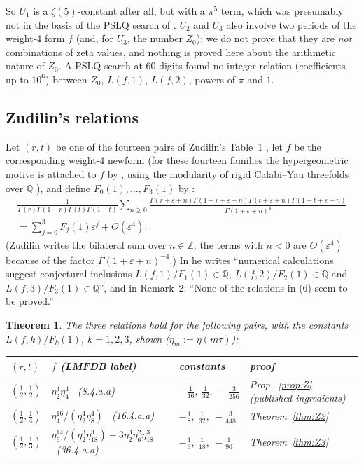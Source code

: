 \documentclass[11pt]{amsart}
\newtheorem{theorem}{Theorem}[section]
\theoremstyle{definition}
\theoremstyle{remark}
\numberwithin{equation}{section}
\newcommand{\Q}{\mathbb{Q}}
\newcommand{\Z}{\mathbb{Z}}
\begin{document}
So $U_1$ is a $\zeta(5)$-constant after all, but with a $\pi^5$ term, which was presumably not in the basis of the PSLQ search of \cite{EDCK}. $U_2$ and $U_3$ also involve two periods of the weight-4 form $f$ (and, for $U_3$, the number $Z_0$); we do not prove that they are \emph{not} combinations of zeta values, and nothing is proved here about the arithmetic nature of $Z_0$. A PSLQ search at 60 digits found no integer relation (coefficients up to $10^6$) between $Z_0$, $L(f,1)$, $L(f,2)$, powers of $\pi$ and $1$.

\subsection{Zudilin's relations}
Let $(r,t)$ be one of the fourteen pairs of Zudilin's Table~1 \cite{Zud}, let $f$ be the corresponding weight-4 newform (for these fourteen families the hypergeometric motive is attached to $f$ by \cite[Theorem~2]{LTYZ}, using the modularity of rigid Calabi--Yau threefolds over $\Q$ \cite{GY,DM}), and define $F_0(1),\dots,F_3(1)$ by \cite[(5)]{Zud}:
\begin{multline}\label{eq:Zud5}
\frac{1}{\Gamma(r)\Gamma(1-r)\Gamma(t)\Gamma(1-t)}\sum_{n\ge0}\frac{\Gamma(r+\varepsilon+n)\Gamma(1-r+\varepsilon+n)\Gamma(t+\varepsilon+n)\Gamma(1-t+\varepsilon+n)}{\Gamma(1+\varepsilon+n)^4}\\
=\sum_{j=0}^3F_j(1)\varepsilon^j+O(\varepsilon^4).
\end{multline}
(Zudilin writes the bilateral sum over $n\in\Z$; the terms with $n<0$ are $O(\varepsilon^4)$ because of the factor $\Gamma(1+\varepsilon+n)^{-4}$.) In \cite[(6)]{Zud} he writes ``numerical calculations suggest conjectural inclusions $L(f,1)/F_1(1)\in\Q$, $L(f,2)/F_2(1)\in\Q$ and $L(f,3)/F_3(1)\in\Q$'', and in Remark~2: ``None of the relations in (6) seem to be proved.''

\begin{theorem}\label{thm:Zud}
The three relations \cite[(6)]{Zud} hold for the following pairs, with the constants $L(f,k)/F_k(1)$, $k=1,2,3$, shown ($\eta_m:=\eta(m\tau)$):
\begin{center}\small
\begin{tabular}{@{}llll@{}}
\toprule
$(r,t)$ & $f$ (LMFDB label) & constants & proof\\
\midrule
$(\frac12,\frac12)$ & $\eta_2^4\eta_4^4$ \ (8.4.a.a) & $-\frac1{16},\ \frac1{32},\ -\frac3{256}$ & Prop.~\ref{prop:Z} (published ingredients)\\[3pt]
$(\frac12,\frac14)$ & $\eta_4^{16}/(\eta_2^4\eta_8^4)$ \ (16.4.a.a) & $-\frac18,\ \frac1{32},\ -\frac3{448}$ & Theorem~\ref{thm:Z2}\\[3pt]
$(\frac12,\frac13)$ & $\eta_6^{14}/(\eta_2^3\eta_{18}^3)-3\eta_2^3\eta_6^2\eta_{18}^3$ \ (36.4.a.a) & $-\frac13,\ \frac1{18},\ -\frac1{90}$ & Theorem~\ref{thm:Z3}\\
\bottomrule
\end{tabular}
\end{center}
\end{theorem}
\end{document}
